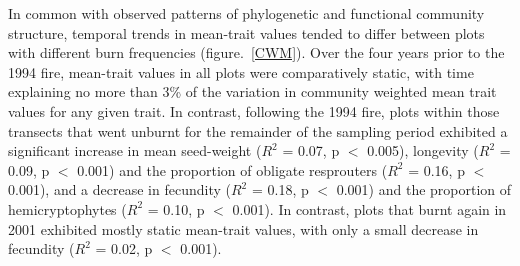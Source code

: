 In common with observed patterns of phylogenetic and functional community structure, temporal trends in mean-trait values tended to differ between plots with different burn frequencies (figure.~\ref{CWM}). Over the four years prior to the 1994 fire, mean-trait values in all plots were comparatively static, with time explaining no more than 3\% of the variation in community weighted mean trait values for any given trait. In contrast, following the 1994 fire, plots within those transects that went unburnt for the remainder of the sampling period exhibited a significant increase in mean seed-weight ($R^{2}$ = 0.07, p $<$ 0.005), longevity ($R^{2}$ = 0.09, p $<$ 0.001) and the proportion of obligate resprouters ($R^{2}$ = 0.16, p $<$ 0.001), and a decrease in fecundity ($R^{2}$ = 0.18, p $<$ 0.001) and the proportion of hemicryptophytes ($R^{2}$ = 0.10, p $<$ 0.001). In contrast, plots that burnt again in 2001 exhibited mostly static mean-trait values, with only a small decrease in fecundity ($R^{2}$ = 0.02, p $<$ 0.001).

